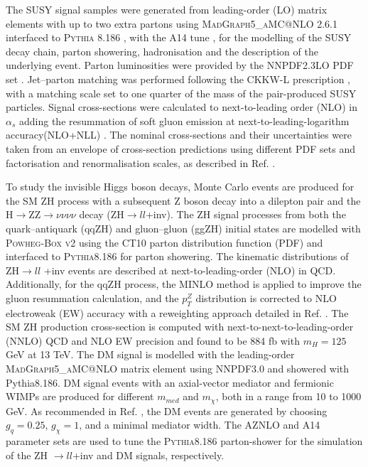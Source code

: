 The SUSY signal samples were generated from leading-order (LO) matrix elements with up to two extra partons using \textsc{MadGraph5\_aMC@NLO 2.6.1} \cite{48} interfaced to \textsc{Pythia 8.186} \cite{49}, with the A14 tune \cite{50}, for the modelling of the SUSY decay chain, parton showering, hadronisation and the description of the underlying event. Parton luminosities were provided by the NNPDF2.3LO PDF set \cite{51}. Jet–parton matching was performed following the CKKW-L prescription \cite{52}, with a matching scale set to one quarter of the mass of the pair-produced SUSY particles. Signal cross-sections were calculated to next-to-leading order (NLO) in $\alpha_s$ adding the resummation of soft gluon emission at next-to-leading-logarithm accuracy(NLO+NLL) \cite{53,54,55,56,57,58,59}. The nominal cross-sections and their uncertainties were taken from an envelope of cross-section predictions using different PDF sets and factorisation and renormalisation scales, as described in Ref. \cite{60}. 


To study the invisible Higgs boson decays, Monte Carlo events are produced for the SM ZH process with a subsequent Z boson decay into a dilepton pair and the H$\rightarrow$ZZ$\rightarrow \nu \nu \nu \nu$ decay (ZH$\rightarrow ll$+inv). The ZH signal processes from both the quark–antiquark (qqZH) and gluon–gluon (ggZH) initial states are modelled with \textsc{Powheg-Box v2} \cite{49Z, 50Z} using the CT10 \cite{51Z} parton distribution function (PDF) and interfaced to \textsc{Pythia8.186} \cite{52Z} for parton showering. The kinematic distributions of ZH$\rightarrow ll$ +inv events are described at next-to-leading-order (NLO) in QCD. Additionally, for the qqZH process, the MINLO \cite{53Z} method is applied to improve the gluon resummation calculation, and the $p_T^Z$ distribution is corrected to NLO electroweak (EW) accuracy with a reweighting approach detailed in Ref. \cite{3Z}. The SM ZH production cross-section is computed with next-to-next-to-leading-order (NNLO) QCD and NLO EW precision and found to be 884 fb \cite{3Z} with $m_H = 125$ GeV at 13 TeV. The DM signal is modelled with the leading-order \textsc{MadGraph5\_aMC@NLO} matrix element \cite{54Z} using NNPDF3.0 \cite{55Z} and showered with Pythia8.186. DM signal events with an axial-vector mediator and fermionic WIMPs are produced for different $m_{med}$ and $m_\chi$, both in a range from 10 to 1000 GeV.  As recommended in Ref. \cite{44Z}, the DM events are generated by choosing $g_q = 0.25$, $g_\chi = 1$, and a minimal mediator width. The AZNLO \cite{56Z} and A14 \cite{57Z} parameter sets are used to tune the \textsc{Pythia8.186} parton-shower for the simulation of the ZH $\rightarrow ll$+inv and DM signals, respectively.


